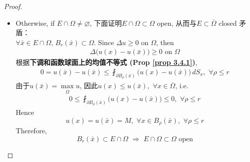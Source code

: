\begin{thm}
\begin{proof}
\begin{itemize}
				\item Otherwise, if $E \cap \Omega \neq \varnothing$, 下面证明$E \cap \Omega \subset \Omega$ open, 从而与$E \subset \overline{\Omega}$ closed 矛盾：\\
				$\forall \bar{x} \in E \cap \Omega$, $B_{r}(\bar{x}) \subset \Omega$. Since $\Delta u \geq 0$ on $\Omega$, then
				\begin{align*}
					\Delta \Big( u(x) - u(\bar{x}) \Big) \geq 0 \,\, \text{on} \,\, \Omega
				\end{align*}
				根据\textbf{下调和函数球面上的均值不等式 (Prop \ref{prop 3.4.1})}, 
				\begin{align*}
					0 
					= u(\bar{x}) - u(\bar{x}) 
					\leq \fint_{\partial B_{\rho}(\bar{x})} \Big( u(x) - u(\bar{x}) \Big) \, dS_x , \,\, \forall \rho \leq r
				\end{align*}
				由于$u(\bar{x}) = \underset{\overline{\Omega}}{\max} u$, 因此$u(x) \leq u(\bar{x}) , \,\, \forall x \in \overline{\Omega}$, i.e.
				\begin{align*}
					0 \leq \fint_{\partial B_{\rho}(\bar{x})} \Big( u(x) - u(\bar{x}) \Big) \leq 0 , \,\, \forall \rho \leq r
				\end{align*}
				Hence
				\[ u(x) = u(\bar{x}) = M , \,\, \forall x \in B_{\rho}(\bar{x}) , \,\, \forall \rho \leq r \]
				Therefore, 
				\[ B_{r}(\bar{x}) \subset E \cap \Omega \,\, \Rightarrow \,\, E \cap \Omega \subset \Omega \,\, \text{open} \]
			\end{itemize}
		\end{proof}
	\end{thm}















	\ifx\allfiles\undefined

\fi